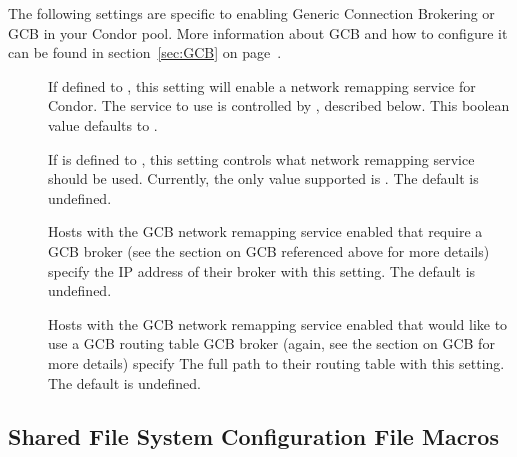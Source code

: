 The following settings are specific to enabling Generic Connection
Brokering or GCB in your Condor pool.
More information about GCB and how to configure it can be found in
section~\ref{sec:GCB} on page~\pageref{sec:GCB}.

\begin{description}

\item[] 
  If defined to \verb@TRUE@, this setting will enable a network
  remapping service for Condor.
  The service to use is controlled by ,
  described below.
  This boolean value defaults to \verb@FALSE@.

\item[] If  is
  defined to \verb@TRUE@, this setting controls what network remapping
  service should be used.
  Currently, the only value supported is \verb@GCB@.
  The default is undefined.

\item[]
  Hosts with the GCB network remapping service enabled that require a
  GCB broker (see the section on GCB referenced above for more
  details) specify the IP address of their broker with this setting.
  The default is undefined.

\item[]
  Hosts with the GCB network remapping service enabled that would like
  to use a GCB routing table 
  GCB broker (again, see the section on GCB for more details) specify
  The full path to their routing table with this setting.
  The default is undefined.

\end{description}

\subsection{\label{sec:Shared-Filesystem-Config-File-Entries}Shared File System Configuration File Macros} 

